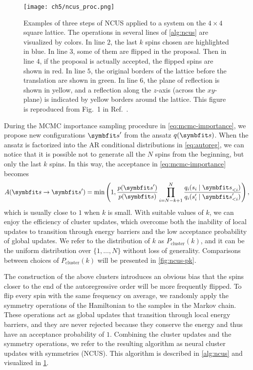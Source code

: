 \begin{figure}[htb]
\centering
\texttt{[image: ch5/ncus\_proc.png]}
\caption[Procedure of neural cluster updates with symmetries (NCUS)]{
Examples of three steps of NCUS applied to a system on the $4 \times 4$ square lattice. The operations in several lines of \cref{alg:ncus} are visualized by colors.
In line $2$, the last $k$ spins chosen are highlighted in {\color[HTML]{1f77b4} blue}.
In line $3$, some of them are flipped in the proposal.
Then in line $4$, if the proposal is actually accepted, the flipped spins are shown in {\color[HTML]{d62728} red}.
In line $5$, the original borders of the lattice before the translation are shown in {\color[HTML]{2ca02c} green}.
In line $6$, the plane of reflection is shown in {\color[HTML]{bcbd22} yellow}, and a reflection along the $z$-axis (across the $x y$-plane) is indicated by yellow borders around the lattice.
This figure is reproduced from Fig.~1 in Ref.~\cite{wu2021unbiased}.
}
\label{fig:ncus-proc}
\end{figure}

During the MCMC importance sampling procedure in \cref{eq:mcmc-importance}, we propose new configurations $\vs'$ from the ansatz $q(\vs)$. When the ansatz is factorized into the AR conditional distributions in \cref{eq:autoreg}, we can notice that it is possible not to generate all the $N$ spins from the beginning, but only the last $k$ spins. In this way, the acceptance in \cref{eq:mcmc-importance} becomes
\begin{equation}
A(\vs \to \vs') = \min\left( 1, \frac{p(\vs')}{p(\vs)} \prod_{i = N - k + 1}^N \frac{q_i(s_i \mid \vs_{< i})}{q_i(s'_i \mid \vs'_{< i})} \right),
\label{eq:ncus-a}
\end{equation}
which is usually close to $1$ when $k$ is small. With suitable values of $k$, we can enjoy the efficiency of cluster updates, which overcome both the inability of local updates to transition through energy barriers and the low acceptance probability of global updates. We refer to the distribution of $k$ as $P_\text{cluster}(k)$, and it can be the uniform distribution over $\{1, \ldots, N\}$ without loss of generality. Comparisons between choices of $P_\text{cluster}(k)$ will be presented in \cref{fig:ncus-pk}.

The construction of the above clusters introduces an obvious bias that the spins closer to the end of the autoregressive order will be more frequently flipped. To flip every spin with the same frequency on average, we randomly apply the symmetry operations of the Hamiltonian to the samples in the Markov chain. These operations act as global updates that transition through local energy barriers, and they are never rejected because they conserve the energy and thus have an acceptance probability of $1$. Combining the cluster updates and the symmetry operations, we refer to the resulting algorithm as neural cluster updates with symmetries (NCUS). This algorithm is described in \cref{alg:ncus} and visualized in \cref{fig:ncus-proc}.

